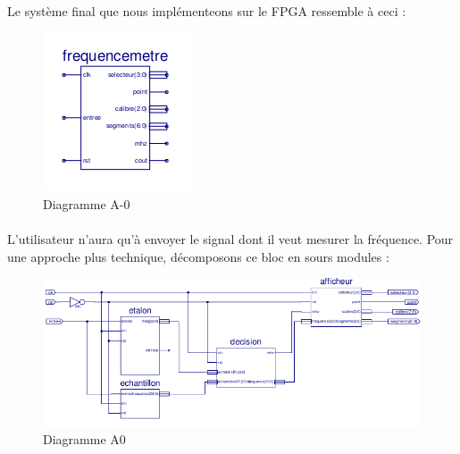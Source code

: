 \documentclass[a4paper,11pt]{article}
\begin{document}
  \paragraph{}Le système final que nous implémenteons sur le FPGA ressemble à ceci :

\begin{figure}[H]
\begin{center}
	\includegraphics[scale=1]{sch-freqa0.png}
	\caption{Diagramme A-0}
\end{center}
\end{figure}

\paragraph{} L'utilisateur n'aura qu'à envoyer le signal dont il veut mesurer la fréquence. Pour une approche plus technique, décomposons
ce bloc en sours modules :

\begin{figure}[H]
\begin{center}
	\includegraphics[scale=1]{sch-frequencemetre.png}
	\caption{Diagramme A0}
\end{center}
\end{figure}
\end{document}
